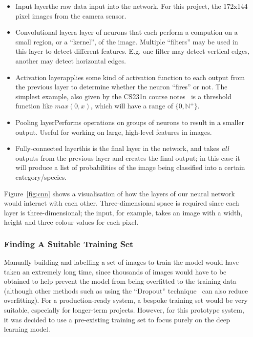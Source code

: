 \begin{itemize}
  \item Input layer\textemdash{}the raw data input into the network. For this
  project, the 172x144 pixel images from the camera sensor.
  \item Convolutional layer\textemdash{}a layer of neurons that each perform
  a compution on a small region, or a ``kernel'', of the image. Multiple
  ``filters'' may be used in this layer to detect different features. E.g.
  one filter may detect vertical edges, another may detect horizontal edges.
  \item Activation layer\textemdash{}applies some kind of activation function
  to each output from the previous layer to determine whether the neuron
  ``fires'' or not. The simplest example, also given by the CS231n course
  notes~\cite{cs321n-cnn} is a threshold function like $max(0, x)$, which
  will have a range of $\{ 0, \mathbb{N}^{+} \}$.
  \item Pooling layer\textemdash{}Performs operations on groups of neurons to
  result in a smaller output. Useful for working on large, high-level
  features in images.
  \item Fully-connected layer\textemdash{}this is the final layer in the
  network, and takes \textit{all} outputs from the previous layer and creates
  the final output; in this case it will produce a list of probabilities of
  the image being classified into a certain category/species.
\end{itemize}



Figure~\ref{fig:cnn} shows a visualisation of how the layers of our neural
network would interact with each other. Three-dimensional space is required
since each layer is three-dimensional; the input, for example, takes an image
with a width, height and three colour values for each pixel.

\subsubsection{Finding A Suitable Training Set}

Manually building and labelling a set of images to train the model would have
taken an extremely long time, since thousands of images would have to be
obtained to help prevent the model from being \gls{overfit}ted to the training
data (although other methods such as using the ``Dropout''
technique~\cite{srivastava2014dropout} can also reduce overfitting). For a
production-ready system, a bespoke training set would be very suitable,
especially for longer-term projects. However, for this prototype system, it
was decided to use a pre-existing training set to focus purely on the deep
learning model.

